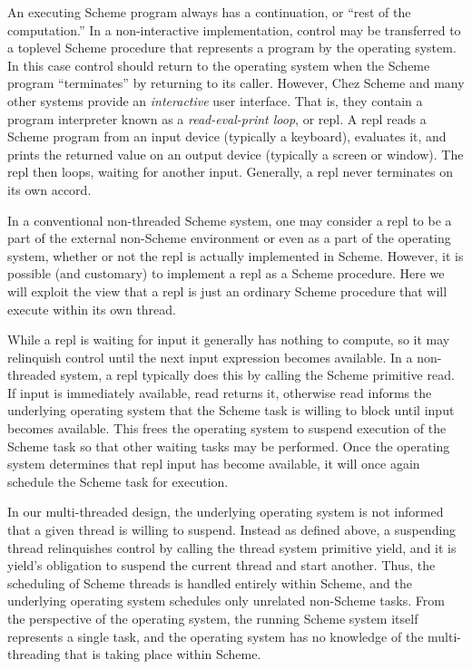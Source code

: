 \documentclass{article}
\begin{document}
An executing Scheme program always has a continuation, or ``rest of
the computation.''  In a non-interactive implementation, control may
be transferred to a toplevel Scheme procedure that represents a
program by the operating system. In this case control should return to
the operating system when the Scheme program ``terminates'' by
returning to its caller.  However, Chez Scheme and many other systems
provide an {\em interactive\/} user interface.  That is, they contain
a program interpreter known as a {\em read-eval-print loop\/}, or 
{\sc repl}.  A {\sc repl} reads a Scheme program from an input device
(typically a keyboard), evaluates it, and prints the returned value on
an output device (typically a screen or window).  The {\sc repl} then
loops, waiting for another input. Generally, a {\sc repl} never
terminates on its own accord.

In a conventional non-threaded Scheme system, one may consider a {\sc repl}
to be a part of the external non-Scheme environment or even as a part
of the operating system, whether or not the {\sc repl} is actually
implemented in Scheme.  However, it is possible (and customary) to
implement a {\sc repl} as a Scheme procedure.  Here we will exploit the view
that a {\sc repl} is just an ordinary Scheme procedure that will execute
within its own thread.

While a {\sc repl} is waiting for input it generally has nothing to compute,
so it may relinquish control until the next input expression becomes
available.  In a non-threaded system, a {\sc repl} typically does this by
calling the Scheme primitive {\sf read}. If input is immediately
available, read returns it, otherwise read informs the underlying
operating system that the Scheme task is willing to block until input
becomes available.  This frees the operating system to suspend
execution of the Scheme task so that other waiting tasks may be
performed.  Once the operating system determines that {\sc repl} input has
become available, it will once again schedule the Scheme task for
execution.

In our multi-threaded design, the underlying operating system is not
informed that a given thread is willing to suspend.  Instead as
defined above, a suspending thread relinquishes control by calling the
thread system primitive {\sf yield}, and it is {\sf yield}'s
obligation to suspend the current thread and start another.  Thus, the
scheduling of Scheme threads is handled entirely within Scheme, and
the underlying operating system schedules only unrelated non-Scheme
tasks.  From the perspective of the operating system, the running
Scheme system itself represents a single task, and the operating
system has no knowledge of the multi-threading that is taking place
within Scheme.
\end{document}
